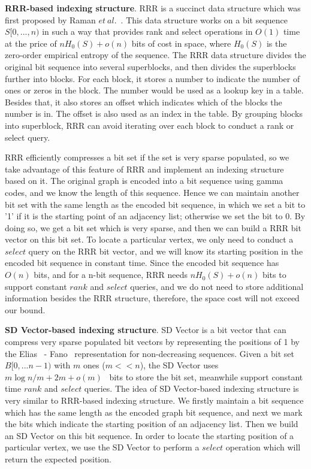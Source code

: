 \documentclass[12pt,glossary]{dalthesis}
\begin{document}
\bigskip
\bigskip

\textbf{RRR-based indexing structure}. RRR is a succinct data structure which was first proposed by Raman $et \ al$.~\cite{RRR}. This data structure works on a bit sequence $S[0,...,n)$ in such a way that provides rank and select operations in $O(1)$ time at the price of $nH_{0}(S)+o(n)$ bits of cost in space, where $H_{0}(S)$ is the zero-order empirical entropy of the sequence. The RRR data structure divides the original bit sequence into several superblocks, and then divides the superblocks further into blocks. For each block, it stores a number to indicate the number of ones or zeros in the block. The number would be used as a lookup key in a table. Besides that, it also stores an offset which indicates which of the blocks the number is in. The offset is also used as an index in the table. By grouping blocks into superblock, RRR can avoid iterating over each block to conduct a rank or select query. 

\bigskip
\bigskip

RRR efficiently compresses a bit set if the set is very sparse populated, so we take advantage of this feature of RRR and implement an indexing structure based on it. The original graph is encoded into a bit sequence using gamma codes, and we know the length of this sequence. Hence we can maintain another bit set with the same length as the encoded bit sequence, in which we set a bit to '1' if it is the starting point of an adjacency list; otherwise we set the bit to 0. By doing so, we get a bit set which is very sparse, and then we can build a RRR bit vector on this bit set. To locate a particular vertex, we only need to conduct a $select$ query on the RRR bit vector, and we will know its starting position in the encoded bit sequence in constant time. Since the encoded bit sequence has $O(n)$ bits, and for a n-bit sequence, RRR needs $nH_{0}(S)+o(n)$ bits to support constant $rank$ and $select$ queries, and we do not need to store additional information besides the RRR structure, therefore, the space cost will not exceed our bound. 

\bigskip
\bigskip

\textbf{SD Vector-based indexing structure}. SD Vector is a bit vector that can compress very sparse populated bit vectors by representing the positions of 1 by the Elias~\cite{Elias} - Fano~\cite{Fano} representation for non-decreasing sequences. Given a bit set $B[0,...n-1)$ with $m$ ones ($m << n$),   the SD Vector uses $m \log n/m  + 2m + o(m)$~\cite{SD-vector} bits to store the bit set, meanwhile support constant time $rank$ and $select$ queries. The idea of SD Vector-based indexing structure is very similar to RRR-based indexing structure. We firstly maintain a bit sequence which has the same length as the encoded graph bit sequence, and next we mark the bits which indicate the starting position of an adjacency list. Then we build an SD Vector on this bit sequence. In order to locate the starting position of a particular vertex, we use the SD Vector to perform a $select$ operation which will return the expected position. 
\end{document}
